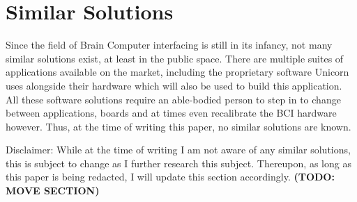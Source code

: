 \section{Similar Solutions}\label{sect:similar solutions}
\hspace{\parindent} Since the field of Brain Computer interfacing is still in its infancy, not many similar solutions exist, at least in the public space. There are multiple suites of applications available on the market, including the proprietary software Unicorn uses alongside their hardware which will also be used to build this application. All these software solutions require an able-bodied person to step in to change between applications, boards and at times even recalibrate the BCI hardware however. Thus, at the time of writing this paper, no similar solutions are known.

\hspace{\parindent} Disclaimer: While at the time of writing I am not aware of any similar solutions, this is subject to change as I further research this subject. Thereupon, as long as this paper is being redacted, I will update this section accordingly. {\bfseries(TODO: MOVE SECTION)}
